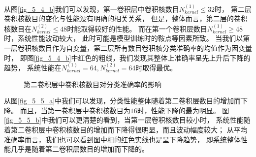 从图\ref{fig_5_4_b}我们可以发现，第一卷积层中卷积核数目$N_{kernel}^{(1)} \leq 32$时，
第二层卷积核数目的变化与性能没有明确的相关关系，
但是，整体而言，第二层的卷积核数目在$N_{kernel}^{(2)} \leq 48$时能取得较好的性能。
而在第一个卷积层数目$N_{kernel}^{(1)} \geq 48$时，系统性能波动较大，
此时可能是模型训练时的鞍点等因素所致。
当我们以第一层卷积核数目作为自变量，第二层所有数目卷积核分类准确率的均值作为因变量时，
即图\ref{fig_5_4_b}中红色的粗线，我们发现其整体上准确率呈先上升后下降的趋势，
系统性能在$N_{kernel}^{(1)} = 64, N_{kernel}^{(2)} =64$时取得最优。
\par

\begin{figure}[!h]
	\centering
	\caption{第二卷积层中卷积核数目对分类准确率的影响}
	\label{fig_5_5}
\end{figure}
从图\ref{fig_5_5_a}中我们可以发现，分类性能整体随着第二卷积层数目的增加而下降。
而且，当第一卷积层中卷积核数目为$16$时，性能下降的最为明显。
图\ref{fig_5_5_b}中我们可以更清楚的看到，当第一层卷积核数目较小时，
系统性能随着第二卷积层中卷积核数目的增加而下降得很明显，而且波动幅度较大；
从平均准确率而言，我们也可以看到图中粗的红色实线也是呈下降趋势，
即系统整体性能几乎是随着第二卷积层数目的增加而下降的。
\par

